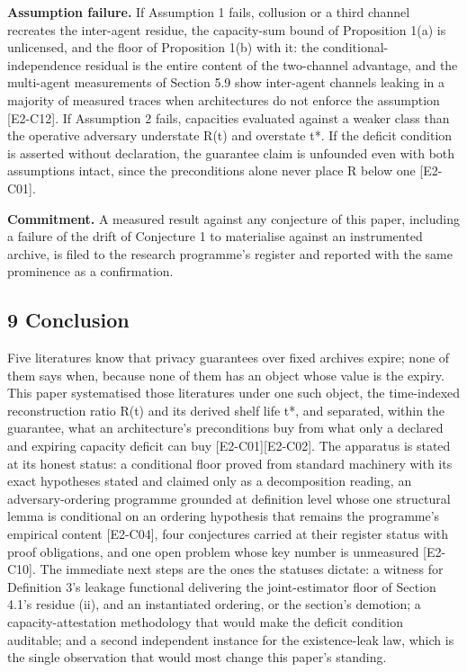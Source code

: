 \documentclass[
  11pt,
]{article}
\begin{document}
\textbf{Assumption failure.} If Assumption 1 fails, collusion or a third
channel recreates the inter-agent residue, the capacity-sum bound of
Proposition 1(a) is unlicensed, and the floor of Proposition 1(b) with
it: the conditional-independence residual is the entire content of the
two-channel advantage, and the multi-agent measurements of Section 5.9
show inter-agent channels leaking in a majority of measured traces when
architectures do not enforce the assumption {[}E2-C12{]}. If Assumption
2 fails, capacities evaluated against a weaker class than the operative
adversary understate R(t) and overstate t*. If the deficit condition is
asserted without declaration, the guarantee claim is unfounded even with
both assumptions intact, since the preconditions alone never place R
below one {[}E2-C01{]}.

\textbf{Commitment.} A measured result against any conjecture of this
paper, including a failure of the drift of Conjecture 1 to materialise
against an instrumented archive, is filed to the research programme's
register and reported with the same prominence as a confirmation.

\subsection{9 Conclusion}\label{conclusion}

Five literatures know that privacy guarantees over fixed archives
expire; none of them says when, because none of them has an object whose
value is the expiry. This paper systematised those literatures under one
such object, the time-indexed reconstruction ratio R(t) and its derived
shelf life t*, and separated, within the guarantee, what an
architecture's preconditions buy from what only a declared and expiring
capacity deficit can buy {[}E2-C01{]}{[}E2-C02{]}. The apparatus is
stated at its honest status: a conditional floor proved from standard
machinery with its exact hypotheses stated and claimed only as a
decomposition reading, an adversary-ordering programme grounded at
definition level whose one structural lemma is conditional on an
ordering hypothesis that remains the programme's empirical content
{[}E2-C04{]}, four conjectures carried at their register status with
proof obligations, and one open problem whose key number is unmeasured
{[}E2-C10{]}. The immediate next steps are the ones the statuses
dictate: a witness for Definition 3's leakage functional delivering the
joint-estimator floor of Section 4.1's residue (ii), and an instantiated
ordering, or the section's demotion; a capacity-attestation methodology
that would make the deficit condition auditable; and a second
independent instance for the existence-leak law, which is the single
observation that would most change this paper's standing.
\end{document}
